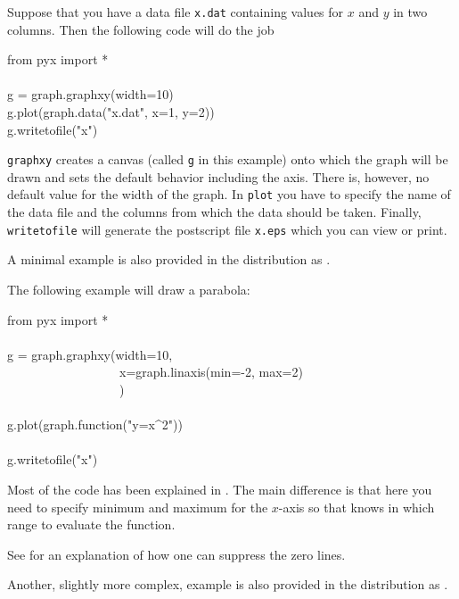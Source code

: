 \documentclass[11pt,DIV14]{scrartcl}
\begin{document}
{}
{\label{q:mingraphdata}
Suppose that you have a data file \texttt{x.dat} containing values for
$x$ and $y$ in two columns. Then the following code will do the job
\begin{progcode}
from pyx import *\\
\\
g = graph.graphxy(width=10)\\
g.plot(graph.data("x.dat", x=1, y=2))\\
g.writetofile("x")
\end{progcode}
\texttt{graphxy} creates a canvas (called \texttt{g} in this example) onto 
which the graph will be drawn and sets the default behavior including the 
axis. There is, however, no default value for the width of the graph. In 
\texttt{plot} you have to specify the name of the data file and the columns 
from which the data should be taken. Finally, \texttt{writetofile} will 
generate the postscript file \texttt{x.eps} which you can view or print.

A minimal example is also provided in the \PyX{} distribution as 
.
}

{}
{The following example will draw a parabola:
\begin{progcode}
from pyx import *\\
\\
g = graph.graphxy(width=10,\\
~~~~~~~~~~~~~~~~~~x=graph.linaxis(min=-2, max=2)\\
~~~~~~~~~~~~~~~~~~)\\
\\
g.plot(graph.function("y=x\^{}2"))\\
\\
g.writetofile("x")
\end{progcode}
Most of the code has been explained in . The main 
difference is that here you need to specify minimum and maximum for the 
$x$-axis so that \PyX{} knows in which range to evaluate the function.

See  for an explanation of how one can suppress the
zero lines.

Another, slightly more complex, example is also provided in the \PyX{} 
distribution as .
}
\end{document}
